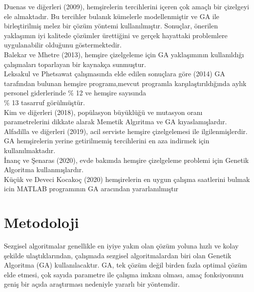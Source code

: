 \documentclass[12pt, a4paper]{article}
\begin{document}
\begin{flushleft}
	\cite{duenas2009genetic} 
    Duenas ve diğerleri (2009), hemşirelerin tercihlerini içeren çok amaçlı bir 
	çizelgeyi ele almaktadır. Bu tercihler bulanık kümelerle modellenmiştir ve GA ile birleştirilmiş melez bir çözüm yöntemi kullanılmıştır. Sonuçlar, önerilen yaklaşımın iyi kalitede çözümler ürettiğini ve gerçek hayattaki problemlere uygulanabilir olduğunu göstermektedir.\\[10pt] 
	
	
	
	\cite{balekar2013survey} 
	Balekar ve Mhetre (2013), hemşire çizelgeleme	için GA yaklaşımının kullanıldığı çalışmaları toparlayan bir kaynakça sunmuştur.\\[10pt]
	
	\cite{leksakul2014nurse} 
    Leksakul ve Phetsawat çalışmasında elde edilen sonuçlara göre (2014) GA tarafından bulunan hemşire programı,mevcut programla karşılaştırıldığında aylık personel giderlerinde \% 12 ve hemşire sayısında \\ \% 13 tasarruf  görülmüştür.\\[10pt]
	 
	 
	\cite{kim2018genetic}
	Kim ve diğerleri (2018), popülasyon 
	büyüklüğü ve mutasyon oranı parametrelerini dikkate alarak Memetik Algıritma ve GA 
	kıyaslamışlardır.\\[10pt]
	
	\cite{alfadilla2019optimization} 
    Alfadilla ve diğerleri (2019), acil serviste hemşire çizelgelemesi ile 
	ilgilenmişlerdir. GA hemşirelerin yerine getirilmemiş tercihlerini en aza indirmek için 
	kullanılmaktadır.\\[10pt] 
	
	\cite{inancc2020solving} 
	İnanç ve Şenaras (2020), evde bakımda hemşire çizelgeleme problemi için 
	Genetik Algoritma kullanmışlardır.\\[10pt]
	
	\cite{kuccuk2021hemcsire} 
	Küçük ve Deveci Kocakoç (2020) hemşirelerin en uygun çalışma saatlerini bulmak icin  MATLAB programının GA aracından yararlanılmıştır
	
	\newpage	
	\section{Metodoloji}
	Sezgisel algoritmalar 
	genellikle en iyiye yakın olan çözüm yoluna hızlı ve kolay şekilde ulaştıklarından, çalışmada sezgisel algoritmalardan biri olan Genetik Algoritma (GA) kullanılacaktır. GA, tek çözüm değil birden fazla optimal çözüm elde etmesi, çok sayıda parametre ile çalışma imkanı olması, amaç fonksiyonunu geniş bir açıda araştırması nedeniyle yararlı bir yöntemdir. 
	\\[5pt]

\end{flushleft}
\end{document}
